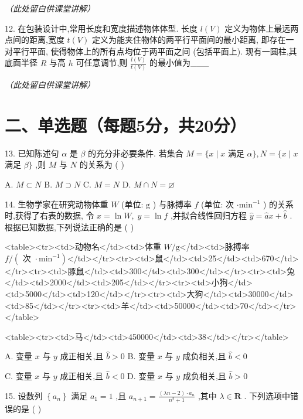 \documentclass[10pt]{article}
\newcommand{\boardspace}[1]{%
  \par\vspace{#1}
}
\newcommand{\hardboardspace}{%
  \par\vspace{5cm}
  \hfill\textit{（此处留白供课堂讲解）}
  \par\vspace{1cm}
}
\begin{document}
\hardboardspace

12. 在包装设计中,常用长度和宽度描述物体体型. 长度 \(l\left( V\right)\) 定义为物体上最远两点间的距离,宽度 \(t\left( V\right)\) 定义为能夹住物体的两平行平面间的最小距离, 即存在一对平行平面, 使得物体上的所有点均位于两平面之间 (包括平面上). 现有一圆柱,其底面半径 \(R\) 与高 \(h\) 可任意调节,则 \(\frac{l\left( V\right) }{t\left( V\right) }\) 的最小值为___

\hardboardspace

\section*{二、单选题（每题5分，共20分）}

13. 已知陈述句 \(\alpha\) 是 \(\beta\) 的充分非必要条件. 若集合 \(M = \{ x \mid  x\) 满足 \(\alpha \} , N = \{ x \mid  x\) 满足 \(\beta \}\) ,则 \(M\) 与 \(N\) 的关系为 ( )

A. \(M \subset  N\) B. \(M \supset  N\) C. \(M = N\) D. \(M \cap  N = \varnothing\)

\boardspace{1.5cm}

14. 生物学家在研究动物体重 \(W\) (单位: \(\mathrm{g}\) ) 与脉搏率 \(f\) (单位: 次 \(\cdot  {\mathrm{{min}}}^{-1}\) ) 的关系时,获得了右表的数据, 令 \(x = \ln W,\;y = \ln f\) ,并拟合线性回归方程 \(\widehat{y} = \widehat{a}x + \widehat{b}\) . 根据已知数据,下列说法正确的是 ( )

<table><tr><td>动物名</td><td>体重 \(W/\mathrm{g}\)</td><td>脉搏率 \(f/\left( {\text{ 次 } \cdot  {\mathrm{{min}}}^{-1}}\right)\)</td></tr><tr><td>鼠</td><td>25</td><td>670</td></tr><tr><td>豚鼠</td><td>300</td><td>300</td></tr><tr><td>兔</td><td>2000</td><td>205</td></tr><tr><td>小狗</td><td>5000</td><td>120</td></tr><tr><td>大狗</td><td>30000</td><td>85</td></tr><tr><td>羊</td><td>50000</td><td>70</td></tr></table>

<table><tr><td>马</td><td>450000</td><td>38</td></tr></table>

A. 变量 \(x\) 与 \(y\) 成正相关,且 \(\widehat{b} > 0\) B. 变量 \(x\) 与 \(y\) 成负相关,且 \(\widehat{b} < 0\)

C. 变量 \(x\) 与 \(y\) 成正相关,且 \(\widehat{b} < 0\) D. 变量 \(x\) 与 \(y\) 成负相关,且 \(\widehat{b} > 0\)

\boardspace{1.5cm}

15. 设数列 \(\left\{  {a}_{n}\right\}\) 满足 \({a}_{1} = 1\) ,且 \({a}_{n + 1} = \frac{\left( {{\lambda n} - 2}\right)  \cdot  {a}_{n}}{{n}^{2} + 1}\) ,其中 \(\lambda  \in  \mathbf{R}\) . 下列选项中错误的是 ( )
\end{document}
